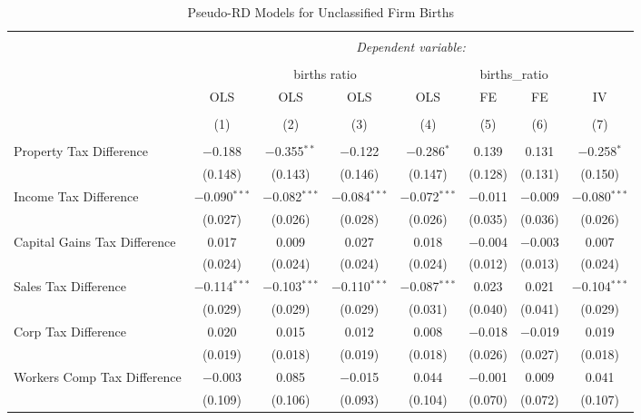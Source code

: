
\begin{table}[!htbp] \centering 
  \caption{Pseudo-RD Models for  Unclassified Firm Births} 
  \label{} 
\begin{tabular}{@{\extracolsep{5pt}}lccccccc} 
\\[-1.8ex]\hline 
\hline \\[-1.8ex] 
 & \multicolumn{7}{c}{\textit{Dependent variable:}} \\ 
\cline{2-8} 
\\[-1.8ex] & \multicolumn{4}{c}{births ratio} & \multicolumn{2}{c}{births\_ratio} &   \\ 
 & OLS & OLS & OLS & OLS & FE & FE & IV \\ 
\\[-1.8ex] & (1) & (2) & (3) & (4) & (5) & (6) & (7)\\ 
\hline \\[-1.8ex] 
 Property Tax Difference & $-$0.188 & $-$0.355$^{**}$ & $-$0.122 & $-$0.286$^{*}$ & 0.139 & 0.131 & $-$0.258$^{*}$ \\ 
  & (0.148) & (0.143) & (0.146) & (0.147) & (0.128) & (0.131) & (0.150) \\ 
  Income Tax Difference & $-$0.090$^{***}$ & $-$0.082$^{***}$ & $-$0.084$^{***}$ & $-$0.072$^{***}$ & $-$0.011 & $-$0.009 & $-$0.080$^{***}$ \\ 
  & (0.027) & (0.026) & (0.028) & (0.026) & (0.035) & (0.036) & (0.026) \\ 
  Capital Gains Tax Difference & 0.017 & 0.009 & 0.027 & 0.018 & $-$0.004 & $-$0.003 & 0.007 \\ 
  & (0.024) & (0.024) & (0.024) & (0.024) & (0.012) & (0.013) & (0.024) \\ 
  Sales Tax Difference & $-$0.114$^{***}$ & $-$0.103$^{***}$ & $-$0.110$^{***}$ & $-$0.087$^{***}$ & 0.023 & 0.021 & $-$0.104$^{***}$ \\ 
  & (0.029) & (0.029) & (0.029) & (0.031) & (0.040) & (0.041) & (0.029) \\ 
  Corp Tax Difference & 0.020 & 0.015 & 0.012 & 0.008 & $-$0.018 & $-$0.019 & 0.019 \\ 
  & (0.019) & (0.018) & (0.019) & (0.018) & (0.026) & (0.027) & (0.018) \\ 
  Workers Comp Tax Difference & $-$0.003 & 0.085 & $-$0.015 & 0.044 & $-$0.001 & 0.009 & 0.041 \\ 
  & (0.109) & (0.106) & (0.093) & (0.104) & (0.070) & (0.072) & (0.107) \\ 

\end{tabular}
\end{table}
